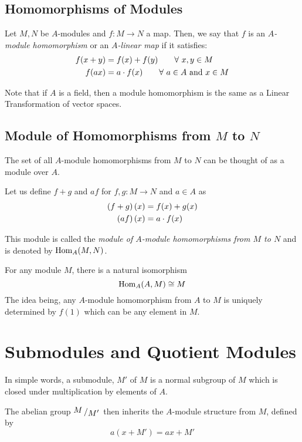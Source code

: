 \subsection{Homomorphisms of Modules}
\begin{defn}{}{}
	Let \(M, N\) be \(A\)-modules and \(f: M \to N\) a map.
	Then, we say that \(f\) is an \emph{\(A\)-module homomorphism} or an
	\emph{\(A\)-linear map} if it satisfies:
	\begin{align*}
		f(x + y) &= f(x) + f(y) \quad\quad \forall\ x, y \in M \\
		f(ax) &= a \cdot f(x) \quad \quad \forall\ a \in A \text{ and } x \in M
	\end{align*}
\end{defn}

Note that if \( A \) is a field, then a module homomorphism is
the same as a Linear Transformation of vector spaces.


\subsection{Module of Homomorphisms from \(M\) to \(N\)}
The set of all \(A\)-module homomorphisms from \(M\) to \(N\) can
be thought of as a module over \(A\).

Let us define \(f+g\) and \(af\) for \(f, g: M \to N\) and \(a \in A\) as
\begin{align*}
	\left( f+g \right)(x) &= f(x) + g(x) \\
	\left( af \right)(x) &= a \cdot f(x)
\end{align*}

This module is called the \emph{module of \(A\)-module homomorphisms
from \(M\) to \(N\)} and is denoted by \(\operatorname{Hom}_A(M, N)\).

For any module \(M\), there is a natural isomorphism
\[
	\operatorname{Hom}_A(A, M) \cong M
\]
The idea being, any \(A\)-module homomorphism from \(A\) to \(M\) is
uniquely determined by \(f(1)\) which can be any element in \(M\).



\section{Submodules and Quotient Modules}
In simple words, a submodule, \(M'\) of \(M\) is a normal subgroup of \(M\)
which is closed under multiplication by elements of \(A\).

The abelian group \(\bigslant{M}{M'}\) then inherits the \(A\)-module
structure from \(M\), defined by
\[
	a(x+M') = ax + M'
\]

